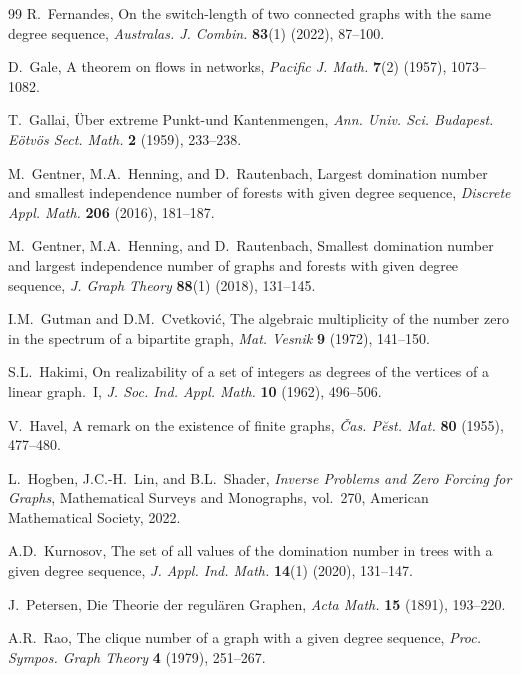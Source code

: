 \documentclass{BICA}
\begin{document}
\begin{thebibliography}{99}
R.~Fernandes,
  On the switch-length of two connected graphs with the same degree sequence,
  \textsl{Australas. J. Combin.} \textbf{83}(1) (2022), 87--100.

D.~Gale,
  A theorem on flows in networks,
  \textsl{Pacific J. Math.} \textbf{7}(2) (1957), 1073--1082.

T.~Gallai,
  \"{U}ber extreme Punkt-und Kantenmengen,
  \textsl{Ann. Univ. Sci. Budapest. E\"{o}tv\"{o}s Sect. Math.} \textbf{2} (1959),
  233--238.

M.~Gentner, M.A.~Henning, and D.~Rautenbach,
  Largest domination number and smallest independence number of forests with given
  degree sequence,
  \textsl{Discrete Appl. Math.} \textbf{206} (2016), 181--187.

M.~Gentner, M.A.~Henning, and D.~Rautenbach,
  Smallest domination number and largest independence number of graphs and forests
  with given degree sequence,
  \textsl{J. Graph Theory} \textbf{88}(1) (2018), 131--145.

I.M.~Gutman and D.M.~Cvetkovi\'c,
  The algebraic multiplicity of the number zero in the spectrum of a bipartite graph,
  \textsl{Mat. Vesnik} \textbf{9} (1972), 141--150.

S.L.~Hakimi,
  On realizability of a set of integers as degrees of the vertices of a linear
  graph.~I,
  \textsl{J. Soc. Ind. Appl. Math.} \textbf{10} (1962), 496--506.

V.~Havel,
  A remark on the existence of finite graphs,
  \textsl{\v{C}as. P\u{e}st. Mat.} \textbf{80} (1955), 477--480.

L.~Hogben, J.C.-H.~Lin, and B.L.~Shader,
  \textsl{Inverse Problems and Zero Forcing for Graphs},
  Mathematical Surveys and Monographs, vol.~270,
  American Mathematical Society, 2022.

A.D.~Kurnosov,
  The set of all values of the domination number in trees with a given degree
  sequence,
  \textsl{J. Appl. Ind. Math.} \textbf{14}(1) (2020), 131--147.

J.~Petersen,
  Die Theorie der regul\"aren Graphen,
  \textsl{Acta Math.} \textbf{15} (1891), 193--220.

A.R.~Rao,
  The clique number of a graph with a given degree sequence,
  \textsl{Proc. Sympos. Graph Theory} \textbf{4} (1979), 251--267.


\end{thebibliography}
\end{document}
